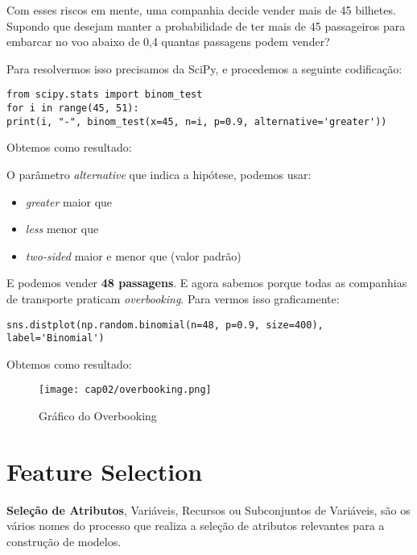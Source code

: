 Com esses riscos em mente, uma companhia decide vender mais de 45 bilhetes. Supondo que desejam manter a probabilidade de ter mais de 45 passageiros para embarcar no voo abaixo de 0,4 quantas passagens podem vender?

Para resolvermos isso precisamos da SciPy, e procedemos a seguinte codificação:
\begin{lstlisting}[]
from scipy.stats import binom_test
for i in range(45, 51):
print(i, "-", binom_test(x=45, n=i, p=0.9, alternative='greater'))
\end{lstlisting}

Obtemos como resultado: \\

O parâmetro \textit{alternative} que indica a hipótese, podemos usar: \vspace{-1em}
\begin{itemize}[nolistsep]
	\item \textit{greater} maior que
	\item \textit{less} menor que
	\item \textit{two-sided} maior e menor que (valor padrão)
\end{itemize}

E podemos vender \textbf{48 passagens}. E agora sabemos porque todas as companhias de transporte praticam \textit{overbooking}. Para vermos isso graficamente:
\begin{lstlisting}[]
sns.distplot(np.random.binomial(n=48, p=0.9, size=400), label='Binomial')
\end{lstlisting}

Obtemos como resultado:
\begin{figure}[H]
	\centering
	\texttt{[image: cap02/overbooking.png]}
	\caption{Gráfico do Overbooking}
\end{figure}

\section{Feature Selection}
\textbf{Seleção de Atributos}, Variáveis, Recursos ou Subconjuntos de Variáveis, são os vários nomes do processo que realiza a seleção de atributos relevantes para a construção de modelos. 

